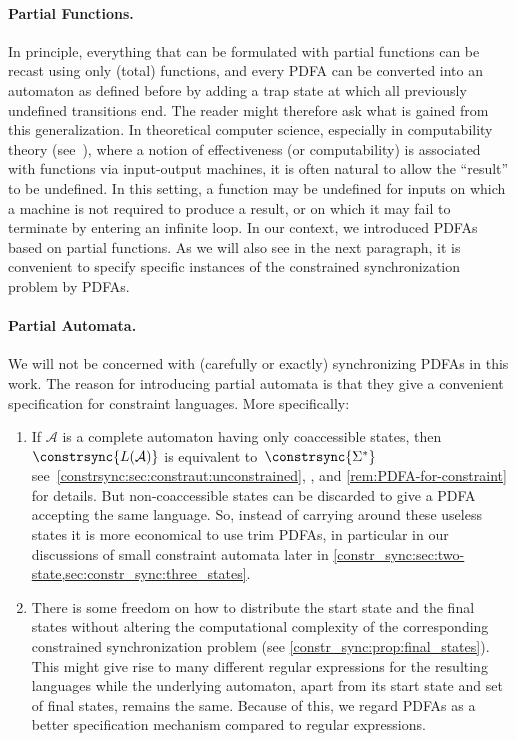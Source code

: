 
\paragraph{Partial Functions.} 
In principle, everything that can be formulated with partial functions
can be recast using only (total) functions, and every PDFA
can be converted into an automaton as defined before by adding a trap
state at which all previously undefined transitions end. 
The reader might therefore ask what is gained from this generalization. 
In theoretical computer science, especially in computability theory (see~\cite{HopUll79,DBLP:books/daglib/0088160}), where a notion of effectiveness (or computability) is associated with functions via input-output machines, it is often natural to allow the ``result'' to be undefined. In this setting, a function may be undefined for inputs on which a machine is not required to produce a result, or on which it may fail to terminate by entering an infinite loop.
In our context, we introduced PDFAs based on partial functions.  
As we will also see in the next paragraph, it is convenient to specify specific instances of the constrained
synchronization problem by PDFAs.

\paragraph{Partial Automata.} We will not be concerned with (carefully or exactly)
synchronizing PDFAs in this work. The reason for introducing partial automata
is that they give a convenient specification for constraint languages.
More specifically:
\begin{enumerate}
	\item If $\mathcal A$ is a complete automaton having only coaccessible states, 
	then $\constrsync{L(\mathcal A)}$
	is equivalent to~$\constrsync{\Sigma^*}$
	see~\cref{constrsync:sec:constraut:unconstrained}, 
	, and \cref{rem:PDFA-for-constraint} for details.
	But non-coaccessible states can be discarded to give
	a PDFA accepting the same language.
    So, instead of carrying around these useless states it is more economical 
	to use trim PDFAs, in particular in our discussions of small constraint automata later in \cref{constr_sync:sec:two-state,sec:constr_sync:three_states}. 
	
	\item There is some freedom on how to distribute the start state and the final states 
	without altering the computational complexity of the corresponding constrained synchronization problem (see \cref{constr_sync:prop:final_states}). 
	This might give rise to many different regular expressions 
	for the resulting languages while the underlying automaton, apart from its start state and set of final states,
	remains the same.
	Because of this, we regard PDFAs as a better specification mechanism compared to regular expressions.
\end{enumerate}

